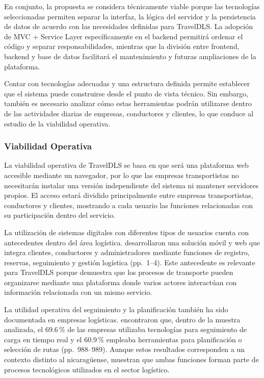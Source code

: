En conjunto, la propuesta se considera técnicamente viable porque las tecnologías seleccionadas permiten separar la interfaz, la lógica del servidor y la persistencia de datos de acuerdo con las necesidades definidas para TravelDLS. La adopción de MVC + Service Layer específicamente en el backend permitirá ordenar el código y separar responsabilidades, mientras que la división entre frontend, backend y base de datos facilitará el mantenimiento y futuras ampliaciones de la plataforma.

Contar con tecnologías adecuadas y una estructura definida permite establecer que el sistema puede construirse desde el punto de vista técnico. Sin embargo, también es necesario analizar cómo estas herramientas podrán utilizarse dentro de las actividades diarias de empresas, conductores y clientes, lo que conduce al estudio de la viabilidad operativa.

\subsubsection{Viabilidad Operativa}

La viabilidad operativa de TravelDLS se basa en que será una plataforma web accesible mediante un navegador, por lo que las empresas transportistas no necesitarán instalar una versión independiente del sistema ni mantener servidores propios. El acceso estará dividido principalmente entre empresas transportistas, conductores y clientes, mostrando a cada usuario las funciones relacionadas con su participación dentro del servicio.

La utilización de sistemas digitales con diferentes tipos de usuarios cuenta con antecedentes dentro del área logística. \textcite{sultan2022real} desarrollaron una solución móvil y web que integra clientes, conductores y administradores mediante funciones de registro, reservas, seguimiento y gestión logística (pp.~1--4). Este antecedente es relevante para TravelDLS porque demuestra que los procesos de transporte pueden organizarse mediante una plataforma donde varios actores interactúan con información relacionada con un mismo servicio.

La utilidad operativa del seguimiento y la planificación también ha sido documentada en empresas logísticas. \textcite{pauzuoliene2024smart} encontraron que, dentro de la muestra analizada, el 69.6\,\% de las empresas utilizaba tecnologías para seguimiento de carga en tiempo real y el 60.9\,\% empleaba herramientas para planificación o selección de rutas (pp.~988--989). Aunque estos resultados corresponden a un contexto distinto al nicaragüense, muestran que ambas funciones forman parte de procesos tecnológicos utilizados en el sector logístico.

